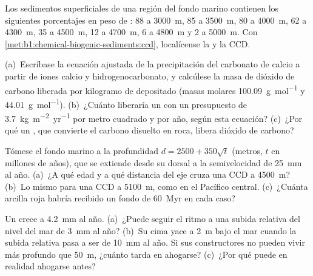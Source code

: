 \begin{exercise}[$\star$]\label{exo:b1:chemical-biogenic-sediments:4}
Los sedimentos superficiales de una región del fondo marino contienen los siguientes porcentajes en peso de : 88 a \qty{3000}{m}, 85 a \qty{3500}{m}, 80 a \qty{4000}{m}, 62 a
\qty{4300}{m}, 35 a \qty{4500}{m}, 12 a \qty{4700}{m}, 6 a \qty{4800}{m} y 2 a \qty{5000}{m}. Con
\cref{met:b1:chemical-biogenic-sediments:ccd}, localícense la  y la CCD.
\end{exercise}

\begin{exercise}[$\star\star$]\label{exo:b1:chemical-biogenic-sediments:5}
(a)~Escríbase la ecuación ajustada de la precipitación del carbonato de calcio a partir de iones calcio y hidrogenocarbonato, y calcúlese la masa de dióxido de carbono liberada por kilogramo de
 depositado (masas molares \qty{100.09}{g.mol^{-1}} y \qty{44.01}{g.mol^{-1}}). (b)~¿Cuánto liberaría un  con un presupuesto de \qty{3.7}{kg.m^{-2}.yr^{-1}} por
metro cuadrado y por año, según esta ecuación? (c)~¿Por qué un , que convierte el carbono disuelto en roca, libera dióxido de carbono?
\end{exercise}

\begin{exercise}[$\star\star$]\label{exo:b1:chemical-biogenic-sediments:6}
Tómese el fondo marino a la profundidad $d = 2500 + 350\sqrt t$ (metros, $t$ en millones de años), que se extiende desde su dorsal a la semivelocidad de \qty{25}{mm} al año. (a)~¿A qué edad
y a qué distancia del eje cruza una CCD a \qty{4500}{m}? (b)~Lo mismo para una CCD a \qty{5100}{m}, como en el Pacífico central. (c)~¿Cuánta arcilla roja habría recibido un fondo de \qty{60}{Myr}
en cada caso?
\end{exercise}

\begin{exercise}[$\star\star$]\label{exo:b1:chemical-biogenic-sediments:7}
Un  crece a \qty{4.2}{mm} al año. (a)~¿Puede seguir el ritmo a una subida relativa del nivel del mar de \qty{3}{mm} al año? (b)~Su cima yace a \qty{2}{m} bajo el mar cuando la subida
relativa pasa a ser de \qty{10}{mm} al año. Si sus constructores no pueden vivir más profundo que \qty{50}{m}, ¿cuánto tarda en ahogarse? (c)~¿Por qué puede en realidad ahogarse antes?
\end{exercise}

